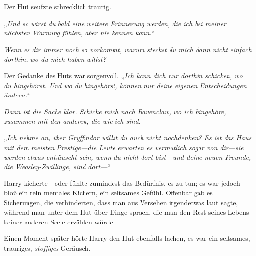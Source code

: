 Der Hut seufzte schrecklich traurig.

„\emph{Und so wirst du bald eine weitere Erinnerung werden, die ich bei meiner nächsten Warnung fühlen, aber nie kennen kann.}“

\emph{Wenn es dir immer noch so vorkommt, warum steckst du mich dann nicht einfach dorthin, wo du mich haben willst?}

Der Gedanke des Huts war sorgenvoll. „\emph{Ich kann dich nur dorthin schicken, wo du hingehörst. Und wo du hingehörst, können nur deine eigenen Entscheidungen ändern.}“

\emph{Dann ist die Sache klar. Schicke mich nach Ravenclaw, wo ich hingehöre, zusammen mit den anderen, die wie ich sind. }

„\emph{Ich nehme an, über Gryffindor willst du auch nicht nachdenken? Es ist das Haus mit dem meisten Prestige—die Leute erwarten es vermutlich sogar von dir—sie werden etwas enttäuscht sein, wenn du nicht dort bist—und deine neuen Freunde, die Weasley-Zwillinge, sind dort—}“

Harry kicherte—oder fühlte zumindest das Bedürfnis, es zu tun; es war jedoch bloß ein rein mentales Kichern, ein seltsames Gefühl. Offenbar gab es Sicherungen, die verhinderten, dass man aus Versehen irgendetwas laut sagte, während man unter dem Hut über Dinge sprach, die man den Rest seines Lebens keiner anderen Seele erzählen würde.

Einen Moment später hörte Harry den Hut ebenfalls lachen, es war ein seltsames, trauriges, \emph{stoffiges} Geräusch.

